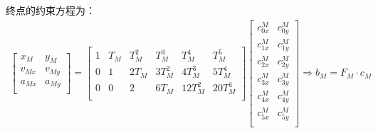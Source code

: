 \documentclass[master,academic]{ysuthesis} %
\begin{document}
		终点的约束方程为：
		\begin{equation}
			\begin{aligned}
			\begin{bmatrix}
				x_M&		y_M\\
				v_{Mx}&		v_{My}\\
				a_{Mx}&		a_{My}\\
			\end{bmatrix} =\begin{bmatrix}
				1&		T_M&		T_M^2&		T_M^3&		T_M^4&    	T_M^5\\
				0&		1&		2T_M&		3T_M^2&		4T_M^3&		5T_M^4\\
				0&		0&		2&		6T_M&		12T_M^2&		20T_M^3\\
			\end{bmatrix} \begin{bmatrix}
				c_{0x}^{M}&		c_{0y}^{M}\\
				c_{1x}^{M}&		c_{1y}^{M}\\
				c_{2x}^{M}&		c_{2y}^{M}\\
				c_{3x}^{M}&		c_{3y}^{M}\\
				c_{4x}^{M}&		c_{4y}^{M}\\
				c_{5x}^{M}&		c_{5y}^{M}\\
			\end{bmatrix} \Longrightarrow b_M=F_M\cdot c_M
			\end{aligned}
		\end{equation}
		
\end{document}
